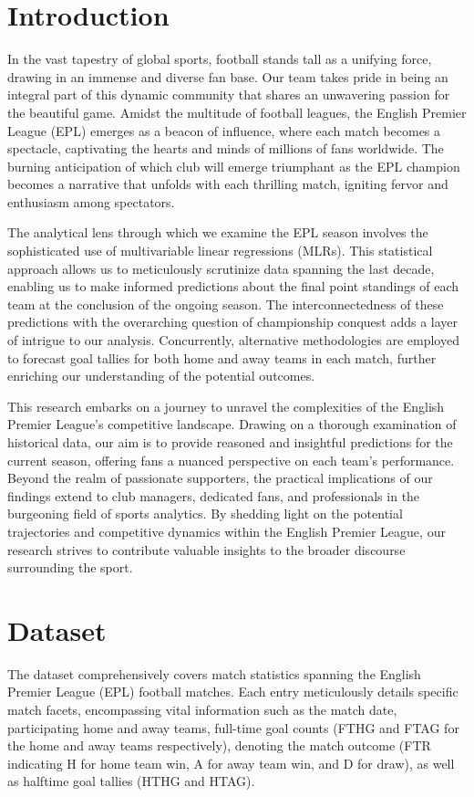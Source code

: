 \documentclass[12pt]{article}
\begin{document}
\section{Introduction}
\label{sec:intro}
In the vast tapestry of global sports, football stands tall as a unifying force, drawing in an immense and diverse fan base. Our team takes pride in being an integral part of this dynamic community that shares an unwavering passion for the beautiful game. Amidst the multitude of football leagues, the English Premier League (EPL) emerges as a beacon of influence, where each match becomes a spectacle, captivating the hearts and minds of millions of fans worldwide. The burning anticipation of which club will emerge triumphant as the EPL champion becomes a narrative that unfolds with each thrilling match, igniting fervor and enthusiasm among spectators.

The analytical lens through which we examine the EPL season involves the sophisticated use of multivariable linear regressions (MLRs). This statistical approach allows us to meticulously scrutinize data spanning the last decade, enabling us to make informed predictions about the final point standings of each team at the conclusion of the ongoing season. The interconnectedness of these predictions with the overarching question of championship conquest adds a layer of intrigue to our analysis. Concurrently, alternative methodologies are employed to forecast goal tallies for both home and away teams in each match, further enriching our understanding of the potential outcomes.

This research embarks on a journey to unravel the complexities of the English Premier League's competitive landscape. Drawing on a thorough examination of historical data, our aim is to provide reasoned and insightful predictions for the current season, offering fans a nuanced perspective on each team's performance. Beyond the realm of passionate supporters, the practical implications of our findings extend to club managers, dedicated fans, and professionals in the burgeoning field of sports analytics. By shedding light on the potential trajectories and competitive dynamics within the English Premier League, our research strives to contribute valuable insights to the broader discourse surrounding the sport.


\section{Dataset}
The dataset comprehensively covers match statistics spanning the English Premier League (EPL) football matches. Each entry meticulously details specific match facets, encompassing vital information such as the match date, participating home and away teams, full-time goal counts (FTHG and FTAG for the home and away teams respectively), denoting the match outcome (FTR indicating H for home team win, A for away team win, and D for draw), as well as halftime goal tallies (HTHG and HTAG).
\end{document}
